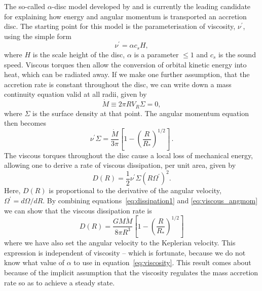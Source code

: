 The so-called $\alpha$-disc model developed by 
\cite[][hereafter SS73]{shakurasunyaev1973} and \cite{lyndenbell1969} is
currently the leading candidate for explaining how energy and angular momentum
is transported an accretion disc. 
The starting point for this model is the parameterisation
of viscosity, $\nu^\prime$, using the simple form
\begin{equation}
\nu^\prime = \alpha c_s H,
\label{eq:viscosity}
\end{equation}
where $H$ is the scale height of the disc,
$\alpha$ is a parameter $\leq 1$ and $c_s$ is the sound speed.
Viscous torques then allow the conversion of orbital kinetic energy into heat, 
which can be radiated away. 
If we make one further assumption, that the accretion rate is
constant throughout the disc, we can write down a mass continuity equation
valid at all radii, given by
\begin{equation}
\dot{M} \equiv 2 \pi R V_R \Sigma = 0,
\end{equation}
where $\Sigma$ is the surface density at that point. 
The angular momentum equation then becomes
\begin{equation}
\nu^\prime \Sigma = \frac{\dot{M}}{3 \pi} \left[1 - \left( \frac{R}{R_*} \right)^{1/2} \right]\, .
\label{eq:viscous_angmom}
\end{equation}
The viscous torques throughout the disc cause a local loss of mechanical energy, allowing 
one to derive \citep[see, e.g.][]{fkrbook} a rate of viscous dissipation, per unit area, given by
\begin{equation}
D(R) = \frac{1}{2} \nu^\prime \Sigma (R \Omega^\prime)^2.
\label{eq:dissipation1}
\end{equation}
Here, $D(R)$ is proportional to the derivative of the angular velocity, $\Omega^\prime=d\Omega/dR$.
By combining equations~\ref{eq:dissipation1} and \ref{eq:viscous_angmom} we can show that the 
viscous dissipation rate is 
\begin{equation}
D(R) = \frac{G M \dot{M}}{8 \pi R^3} \left[1 - \left( \frac{R}{R_*} \right)^{1/2} \right]
\label{eq:dissipation2}
\end{equation}
where we have also set the angular velocity to the Keplerian velocity. 
This expression is independent of viscosity -- which is fortunate, because
we do not know what value of $\alpha$ to use in equation~\ref{eq:viscosity}.
This result comes about because of the implicit assumption that the viscosity regulates
the mass accretion rate so as to achieve a steady state.

